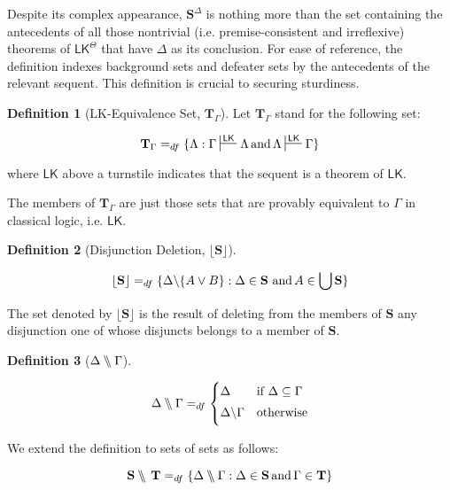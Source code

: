 \documentclass{article}
\theoremstyle{definition}
\theoremstyle{definition}
\theoremstyle{definition}
\theoremstyle{definition}
\newtheorem{definition}{Definition}
\theoremstyle{remark}
\theoremstyle{definition}
\theoremstyle{definition}
\begin{document}
Despite its complex appearance, $\mathbf{S}^{\Delta}$ is nothing more than the set containing the antecedents of all those nontrivial (i.e. premise-consistent and irreflexive) theorems of $\mathsf{LK}^\Theta$ that have $\Delta$ as its conclusion. For ease of reference, the definition indexes background sets and defeater sets by the antecedents of the relevant sequent. This definition is crucial to securing sturdiness.

\begin{definition}[\textsf{LK}-Equivalence Set,  $ \mathbf{T}_{\Gamma} $]\label{def:equiv_set}
	Let  $ \mathbf{T}_{\Gamma}  $ stand for the following set:
	
	$$   \mathbf{T}_{\Gamma}  =_{df} \{\Lambda: \Gamma \sststile{}{\mathsf{LK}} \Lambda \text{\,and\,}  \Lambda \sststile{}{\mathsf{LK}} \Gamma \}$$
	
	where $\mathsf{LK}$ above a turnstile indicates that the sequent is a theorem of $\mathsf{LK}$.
\end{definition}

The members of $ \mathbf{T}_{\Gamma}  $ are just those sets that are provably equivalent to $ \Gamma $ in classical logic, i.e. $ \mathsf{LK} $.

\begin{definition}[Disjunction Deletion, $ \lfloor \mathbf{S} \rfloor $]\label{disjsub}
	
	
	
	
	
	$$ \lfloor\mathbf{S}\rfloor =_{df} \{ \Delta\backslash\{A \vee B\} : \Delta \in \mathbf{S} \text{\,\,and\,} A \in\bigcup\mathbf{S} \} $$
	
	
\end{definition}

The set denoted by $ \lfloor\mathbf{S} \rfloor $ is the result of deleting from the members of $ \mathbf{S} $ any disjunction one of whose disjuncts belongs to a member of $ \mathbf{S} $. 


\begin{definition}[$ \Delta\bbslash\Gamma  $]\label{bbslash}
	
	\begin{equation}
	\Delta\bbslash\Gamma =_{df}
	\begin{cases}\nonumber
	\Delta   & \text{if}\,\, \Delta \subseteq \Gamma \\[3pt] 
	\Delta\backslash\Gamma & \text{otherwise}  \\[3pt] 
	\end{cases}
	\end{equation}
	
	We extend the definition to sets of sets as follows:
	
	$$ \mathbf{S}\bbslash\,\mathbf{T} =_{df} \{\Delta\bbslash\Gamma : \Delta \in \mathbf{S}  \text{\,and\,} \Gamma\in\mathbf{T} \} $$
	
	
\end{definition}
\end{document}
